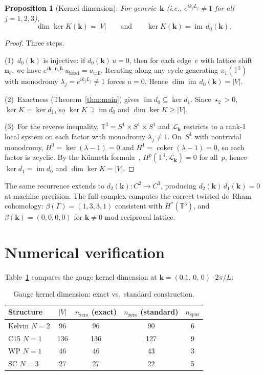 \documentclass[11pt]{article}
\newtheorem{proposition}[theorem]{Proposition}
\theoremstyle{remark}
\newcommand{\bk}{\mathbf{k}}
\newcommand{\bL}{\mathbf{L}}
\newcommand{\bn}{\mathbf{n}}
\newcommand{\TT}{\mathbb{T}}
\newcommand{\im}{\operatorname{im}}
\newcommand{\Ker}{\operatorname{ker}}
\begin{document}
\begin{proposition}[Kernel dimension]\label{prop:kernel}
For generic~$\bk$ (i.e., $e^{ik_j L_j} \neq 1$ for all $j = 1,2,3$),
\[
\dim\Ker K(\bk) = |V| \qquad\text{and}\qquad \Ker K(\bk) = \im\,d_0(\bk).
\]
\end{proposition}

\begin{proof}
Three steps.

\noindent(1)~$d_0(\bk)$ is injective: if $d_0(\bk)\,u = 0$, then for
each edge~$e$ with lattice shift~$\bn_e$, we have
$e^{i\bk\cdot\bn_e\bL}\,u_{\mathrm{head}} = u_{\mathrm{tail}}$.
Iterating along any cycle generating $\pi_1(\TT^3)$ with monodromy
$\lambda_j = e^{ik_j L_j} \neq 1$ forces $u = 0$. Hence
$\dim\im\,d_0(\bk) = |V|$.

\noindent(2)~Exactness (Theorem~\ref{thm:main}) gives
$\im d_0 \subseteq \Ker d_1$. Since $\star_2 > 0$,
$\Ker K = \Ker d_1$, so $\Ker K \supseteq \im d_0$ and
$\dim\Ker K \geq |V|$.

\noindent(3)~For the reverse inequality,
$\TT^3 = S^1 \times S^1 \times S^1$ and $\mathcal{L}_\bk$ restricts to
a rank-1 local system on each factor with monodromy $\lambda_j \neq 1$.
On~$S^1$ with nontrivial monodromy,
$H^0 = \Ker(\lambda{-}1) = 0$ and $H^1 = \operatorname{coker}(\lambda{-}1) = 0$,
so each factor is acyclic. By the K\"unneth
formula~\cite{BottTu1982,Hatcher2002}, $H^p(\TT^3,\mathcal{L}_\bk) = 0$
for all~$p$, hence $\Ker d_1 = \im d_0$ and $\dim\Ker K = |V|$.
\end{proof}

The same recurrence extends to $d_2(\bk)\colon C^2 \to C^3$, producing
$d_2(\bk)\,d_1(\bk) = 0$ at machine precision. The full complex computes
the correct twisted de~Rham cohomology:
$\beta(\Gamma) = (1,3,3,1)$ consistent with $H^*(\TT^3)$, and
$\beta(\bk) = (0,0,0,0)$ for $\bk \neq 0$ mod reciprocal lattice.

\section{Numerical verification}\label{sec:numerics}

Table~\ref{tab:kernel} compares the gauge kernel dimension at
$\bk = (0.1,\,0,\,0)\cdot 2\pi/L$:

\begin{table}[ht]
\centering
\caption{Gauge kernel dimension: exact vs.\ standard construction.}
\label{tab:kernel}
\begin{tabular}{lcccc}
\toprule
Structure & $|V|$ & $n_{\mathrm{zero}}$ (exact) &
$n_{\mathrm{zero}}$ (standard) & $n_{\mathrm{spur}}$ \\
\midrule
Kelvin $N{=}2$ & 96  & 96  & 90  & 6 \\
C15 $N{=}1$    & 136 & 136 & 127 & 9 \\
WP $N{=}1$     & 46  & 46  & 43  & 3 \\
SC $N{=}3$     & 27  & 27  & 22  & 5 \\
\bottomrule
\end{tabular}
\end{table}
\end{document}
